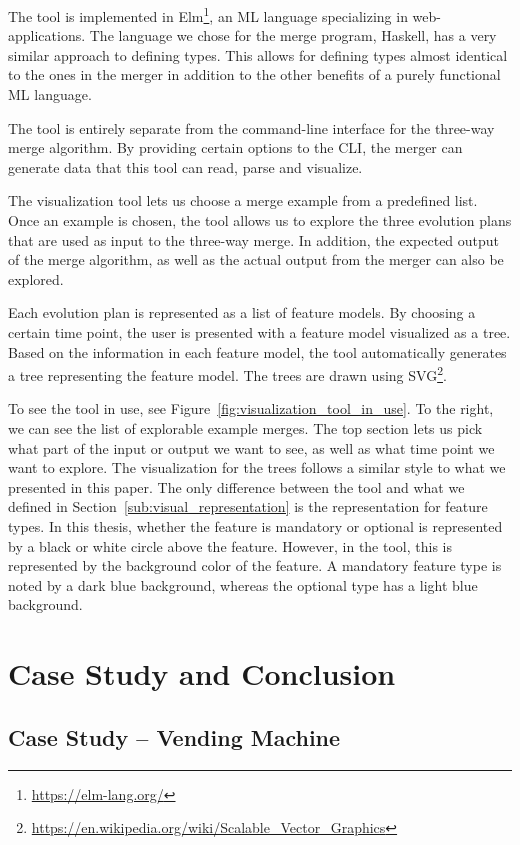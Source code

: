 \documentclass[a4paper,english]{ifimaster}
\begin{document}
The tool is implemented in Elm\footnote{\url{https://elm-lang.org/}}, an ML language specializing in web-applications. The language we chose for the merge program, Haskell, has a very similar approach to defining types. This allows for defining types almost identical to the ones in the merger in addition to the other benefits of a purely functional ML language.

The tool is entirely separate from the command-line interface for the three-way merge algorithm. By providing certain options to the CLI, the merger can generate data that this tool can read, parse and visualize.

The visualization tool lets us choose a merge example from a predefined list. Once an example is chosen, the tool allows us to explore the three evolution plans that are used as input to the three-way merge. In addition, the expected output of the merge algorithm, as well as the actual output from the merger can also be explored.

Each evolution plan is represented as a list of feature models. By choosing a certain time point, the user is presented with a feature model visualized as a tree. Based on the information in each feature model, the tool automatically generates a tree representing the feature model. The trees are drawn using SVG\footnote{\url{https://en.wikipedia.org/wiki/Scalable\_Vector\_Graphics}}.

To see the tool in use, see Figure~\ref{fig:visualization_tool_in_use}. To the right, we can see the list of explorable example merges. The top section lets us pick what part of the input or output we want to see, as well as what time point we want to explore. The visualization for the trees follows a similar style to what we presented in this paper. The only difference between the tool and what we defined in Section~\vref{sub:visual_representation} is the representation for feature types. In this thesis, whether the feature is mandatory or optional is represented by a black or white circle above the feature. However, in the tool, this is represented by the background color of the feature. A mandatory feature type is noted by a dark blue background, whereas the optional type has a light blue background.

\part{Case Study and Conclusion}%
\label{prt:case_study_and_conclusion}

\chapter{Case Study – Vending Machine}%
\label{cha:case_study_vending_machine}
\end{document}

